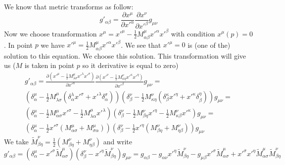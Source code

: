 We know that metric transforms as follow:
%
\begin{equation}
    g'_{\alpha\beta} = \frac{\partial x^\mu}{\partial x'^\alpha}
    \frac{\partial x^\nu}{\partial x'^\beta} g_{\mu\nu}
\end{equation}
%
Now we choose transformation $x^\mu = x'^\mu - \frac{1}{2} M_{\alpha\beta}^\mu
    x'^\alpha x'^\beta $ with condition $x^\mu(p) = 0$. In point $p$ we have
$x'^\mu = \frac{1}{2} M_{\alpha\beta}^\mu x'^\alpha x'^\beta $. We see that
$x'^\mu = 0$ is (one of the) solution to this equation. We choose this
solution.
%
This transformation will give us ($M$ is taken in point $p$ so it derivative is
equal to zero)
%
\allowdisplaybreaks
\begin{multline}
    g'_{\alpha\beta} = \frac{\partial
        (x'^\mu - \frac{1}{2} M_{\lambda\sigma}^\mu x'^\lambda x'^\sigma)}{\partial x'^\alpha}
    \frac{\partial
        (x'^\nu - \frac{1}{2} M_{\kappa\eta}^\nu x'^\kappa x'^\eta)}{\partial x'^\beta}
    g_{\mu\nu} =\\
    \left(\delta^\mu_\alpha -
    \frac{1}{2} M_{\lambda\sigma}^\mu
    (\delta^\lambda_\alpha x'^\sigma + x'^\lambda \delta^\sigma_\alpha)\right)
    \left(\delta^\nu_\beta -
    \frac{1}{2} M_{\kappa\eta}^\nu
    (\delta^\kappa_\beta x'^\eta + x'^\kappa \delta^\eta_\beta)\right)g_{\mu\nu} = \\
    \left(\delta^\mu_\alpha -
    \frac{1}{2} M_{\alpha\sigma}^\mu x'^\sigma -
    \frac{1}{2} M_{\lambda\alpha}^\mu x'^\lambda\right)
    \left(\delta^\nu_\beta -
    \frac{1}{2} M_{\beta\eta}^\nu x'^\eta -
    \frac{1}{2} M_{\kappa\beta}^\nu x'^\kappa\right)g_{\mu\nu} = \\
    \left(\delta^\mu_\alpha -
    \frac{1}{2}x'^\sigma( M_{\alpha\sigma}^\mu + M_{\sigma\alpha}^\mu)\right)
    \left(\delta^\nu_\beta -
    \frac{1}{2} x'^\eta (M_{\beta\eta}^\nu + M_{\eta\beta}^\nu)\right)g_{\mu\nu}
\end{multline}
%
We take $\tilde{M}_{\beta\eta}^\nu = \frac{1}{2}(M_{\beta\eta}^\nu +
    M_{\eta\beta}^\nu)$ and write
%
\begin{equation}
    g'_{\alpha\beta} =
    \left(\delta^\mu_\alpha -
    x'^\sigma \tilde{M}_{\alpha\sigma}^\mu\right)
    \left(\delta^\nu_\beta -
    x'^\eta \tilde{M}_{\beta\eta}^\nu\right)g_{\mu\nu} =
    g_{\alpha\beta} -
    g_{\alpha\nu} x'^\eta \tilde{M}_{\beta\eta}^\nu -
    g_{\mu\beta} x'^\sigma \tilde{M}_{\alpha\sigma}^\mu +
    x'^\sigma  x'^\eta
    \tilde{M}_{\alpha\sigma}^\mu \tilde{M}_{\beta\eta}^\nu
\end{equation}
